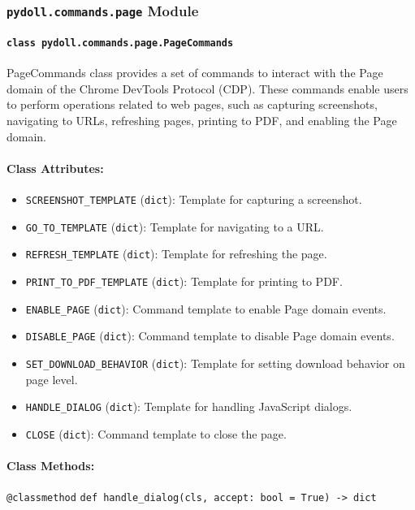 \documentclass{article}
\begin{document}
\subsubsection*{\texttt{pydoll.commands.page} Module}

\paragraph*{\texttt{class pydoll.commands.page.PageCommands}}
\noindent PageCommands class provides a set of commands to interact with the Page domain of the Chrome DevTools Protocol (CDP). These commands enable users to perform operations related to web pages, such as capturing screenshots, navigating to URLs, refreshing pages, printing to PDF, and enabling the Page domain.

\paragraph{Class Attributes:}
\begin{itemize}
    \item \texttt{SCREENSHOT\_TEMPLATE} (\texttt{dict}): Template for capturing a screenshot.
    \item \texttt{GO\_TO\_TEMPLATE} (\texttt{dict}): Template for navigating to a URL.
    \item \texttt{REFRESH\_TEMPLATE} (\texttt{dict}): Template for refreshing the page.
    \item \texttt{PRINT\_TO\_PDF\_TEMPLATE} (\texttt{dict}): Template for printing to PDF.
    \item \texttt{ENABLE\_PAGE} (\texttt{dict}): Command template to enable Page domain events.
    \item \texttt{DISABLE\_PAGE} (\texttt{dict}): Command template to disable Page domain events.
    \item \texttt{SET\_DOWNLOAD\_BEHAVIOR} (\texttt{dict}): Template for setting download behavior on page level.
    \item \texttt{HANDLE\_DIALOG} (\texttt{dict}): Template for handling JavaScript dialogs.
    \item \texttt{CLOSE} (\texttt{dict}): Command template to close the page.
\end{itemize}

\paragraph{Class Methods:}
\noindent\texttt{@classmethod}
\noindent\texttt{def handle\_dialog(cls, accept: bool = True) -> dict}
\end{document}
